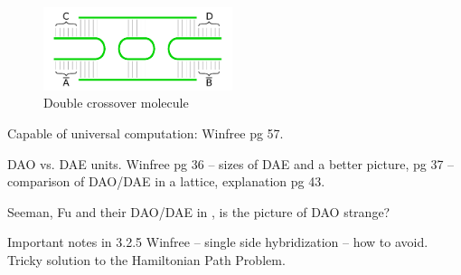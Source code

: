 		\begin{figure}[H]
		\begin{center}
			\includegraphics[width=0.492\textwidth]{./figures/strand_types/double_crossover.pdf}
			\caption{Double crossover molecule}
			\label{fig:double_crossover}
		\end{center}
		\end{figure}
		
		Capable of universal computation: Winfree pg 57.
		
		DAO vs. DAE units. Winfree pg 36 -- sizes of DAE and a better picture, pg 37 -- comparison of DAO/DAE in a lattice, explanation pg 43.
		
		Seeman, Fu and their DAO/DAE in \cite{seeman93}, is the picture of DAO strange?
		
		Important notes in 3.2.5 Winfree -- single side hybridization -- how to avoid. Tricky solution to the Hamiltonian Path Problem.